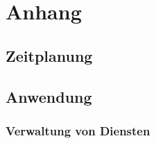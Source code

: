 
\section{Anhang}

\subsection{Zeitplanung}
\label{app:timer}


\subsection{Anwendung}
\label{app:useCase}

\subsubsection{Verwaltung von Diensten}
\label{app:useCase_controll}

